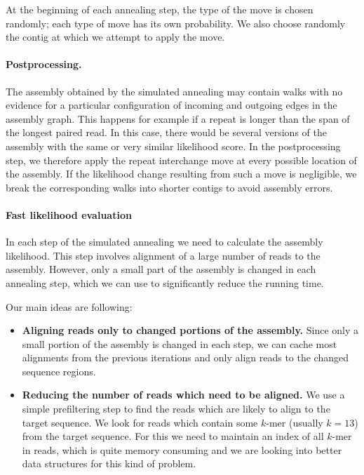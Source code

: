 At the beginning of each annealing step, the type of the move is
chosen randomly; each type of move has its own probability. We also
choose randomly the contig at which we attempt to apply the move. 


\paragraph{Postprocessing.}
The assembly obtained by the simulated annealing may contain walks
with no evidence for a particular configuration of incoming and
outgoing edges in the assembly graph. This happens for example if a
repeat is longer than the span of the longest paired read. In this
case, there would be several versions of the assembly with the same or
very similar likelihood score. 
In the postprocessing step, we therefore apply the repeat
interchange move at every possible location of the assembly. If the
likelihood change resulting from such a move is negligible, 
we break the corresponding walks into shorter contigs
to avoid assembly errors. 

\paragraph{Fast likelihood evaluation}
In each step of the simulated annealing we need to calculate
the assembly likelihood. This step involves
alignment of a large number of reads to the assembly.
However, only a small part of the assembly is changed in each
annealing step, which we can use to significantly reduce the running time.

Our main ideas are following:
\begin{itemize}
\item {\bf Aligning reads only to changed portions of the assembly.}
Since only a small portion of the assembly is changed in each step, 
we can cache most alignments from the previous iterations and only 
align reads to the changed sequence regions.
\item {\bf Reducing the number of reads which need to be aligned.}
We use a simple prefiltering step to
find the reads which are likely to align to the target sequence. 
We look for reads which 
contain some $k$-mer (usually $k=13$) from the target sequence.
For this we need to maintain an index of all $k$-mer in reads, which is
quite memory consuming and we are looking into better data structures for this kind
of problem.
\end{itemize}

